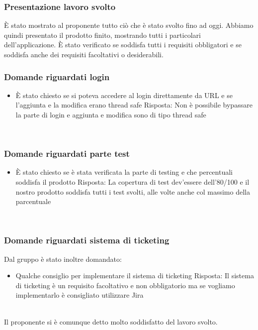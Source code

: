 \documentclass[12pt]{article}
\begin{document}
\subsubsection{Presentazione lavoro svolto}
È stato mostrato al proponente tutto ciò che è stato svolto fino ad oggi.
Abbiamo quindi presentato il prodotto finito, mostrando tutti i particolari dell'applicazione.
È stato verificato se soddisfa tutti i requisiti obbligatori e se soddisfa anche dei requisiti facoltativi o desiderabili.
\\
\subsubsection{Domande riguardati login}
\begin{itemize}
    \item È stato chiesto se si poteva accedere al login direttamente da URL e se l'aggiunta e la modifica erano thread safe
    \subitem Risposta: Non è possibile bypassare la parte di login e aggiunta e modifica sono di tipo thread safe
\end{itemize}
\\
\subsubsection{Domande riguardati parte test}
\begin{itemize}
    \item È stato chiesto se è stata verificata la parte di testing e che percentuali soddisfa il prodotto
    \subitem Risposta: La copertura di test dev'essere dell'80/100 e il nostro prodotto soddisfa tutti i test svolti, alle volte anche col massimo della parcentuale
\end{itemize}
\\
\subsubsection{Domande riguardati sistema di ticketing}
Dal gruppo è stato inoltre domandato: 
\begin{itemize}
    \item Qualche consiglio per implementare il sistema di ticketing
    \subitem Risposta: Il sistema di ticketing è un requisito facoltativo e non obbligatorio ma se vogliamo implementarlo è consigliato utilizzare Jira
\end{itemize}
\\
Il proponente si è comunque detto molto soddisfatto del lavoro svolto. 
\end{document}
